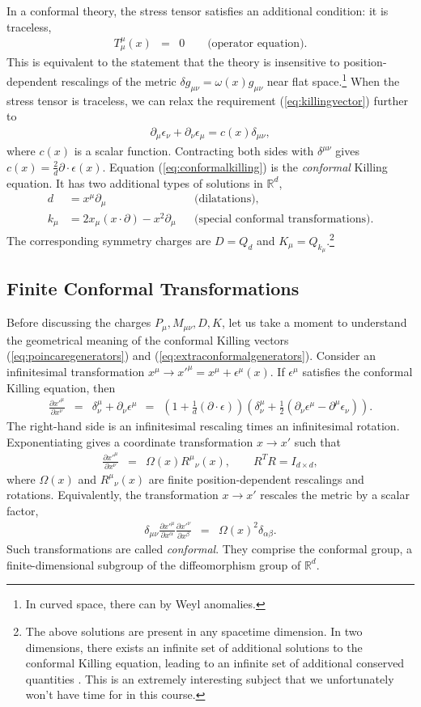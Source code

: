 \documentclass{ws-rv9x6}
\newcommand\be{\begin{eqnarray}}
\newcommand\ee{\end{eqnarray}}
\newcommand\p[1]{\left(#1\right)}
\newcommand\ptl\partial
\newcommand\e\epsilon
\newcommand\<\langle
\renewcommand\>\rangle
\newcommand\de\delta
\newcommand\R{\mathbb{R}}
\newcommand\nn{\nonumber}
\renewcommand\.{\cdot}
\newcommand\x\times
\newcommand\pdr[2]{\frac{\partial #1}{\partial #2}}
\begin{document}
In a conformal theory, the stress tensor satisfies an additional condition: it is traceless,
\be
T_\mu^\mu(x) &=& 0 \qquad\textrm{(operator equation)}.
\ee
This is equivalent to the statement that the theory is insensitive to position-dependent rescalings of the metric $\de g_{\mu\nu}=\omega(x) g_{\mu\nu}$ near flat space.\footnote{In curved space, there can by Weyl anomalies.} When the stress tensor is traceless, we can relax the requirement (\ref{eq:killingvector}) further to
\be
\label{eq:conformalkilling}
\ptl_\mu\e_\nu + \ptl_\nu \e_\mu = c(x)\de_{\mu\nu},
\ee
where $c(x)$ is a scalar function.  Contracting both sides with $\de^{\mu\nu}$ gives $c(x)=\frac{2}{d}\ptl\.\e(x)$.  Equation (\ref{eq:conformalkilling}) is the {\it conformal\/} Killing equation.  It has two additional types of solutions in $\R^d$,
\begin{align}
\label{eq:extraconformalgenerators}
d &= x^\mu \ptl_\mu &&\textrm{(dilatations)},\nn\\
k_\mu &= 2x_\mu (x\.\ptl)-x^2\ptl_\mu &&\textrm{(special conformal transformations)}.
\end{align}
The corresponding symmetry charges are $D=Q_d$ and $K_\mu=Q_{k_\mu}$.\footnote{The above solutions are present in any spacetime dimension.  In two dimensions, there exists an infinite set of additional solutions to the conformal Killing equation, leading to an infinite set of additional conserved quantities \cite{Belavin:1984vu}.  This is an extremely interesting subject that we unfortunately won't have time for in this course.}

\subsection{Finite Conformal Transformations}

Before discussing the charges $P_\mu,M_{\mu\nu},D,K$, let us take a moment to understand the geometrical meaning of the conformal Killing vectors (\ref{eq:poincaregenerators}) and (\ref{eq:extraconformalgenerators}).  Consider an infinitesimal transformation $x^\mu\to x'^\mu=x^\mu+\e^\mu(x)$.  If $\e^\mu$ satisfies the conformal Killing equation, then
\be
\label{eq:conformalinfinitesimal}
\pdr{x'^\mu}{x^\nu} &=& \de^{\mu}_\nu+\ptl_\nu\e^\mu
\ \ =\ \ \p{1+\frac 1 d (\ptl\.\e)}\p{\de^\mu_\nu + \frac 1 2\p{\ptl_\nu \e^\mu - \ptl^\mu \e_\nu}}.
\ee
The right-hand side is an infinitesimal rescaling times an infinitesimal rotation.  Exponentiating gives a coordinate transformation $x\to x'$ such that
\be
\label{eq:conformalfinite}
\pdr{x'^\mu}{x^\nu} &=& \Omega(x)R^\mu{}_\nu{}(x),\qquad R^TR=I_{d\x d},
\ee
where $\Omega(x)$ and $R^\mu{}_\nu{}(x)$ are finite position-dependent rescalings and rotations.
Equivalently, the transformation $x\to x'$ rescales the metric by a scalar factor,
\be
\delta_{\mu\nu}\pdr{x'^\mu}{x^\alpha}\pdr{x'^\nu}{x^\beta} &=& \Omega(x)^2\de_{\alpha\beta}.
\ee
Such transformations are called {\it conformal}. They comprise the conformal group, a finite-dimensional subgroup of the diffeomorphism group of $\R^d$.
\end{document}
